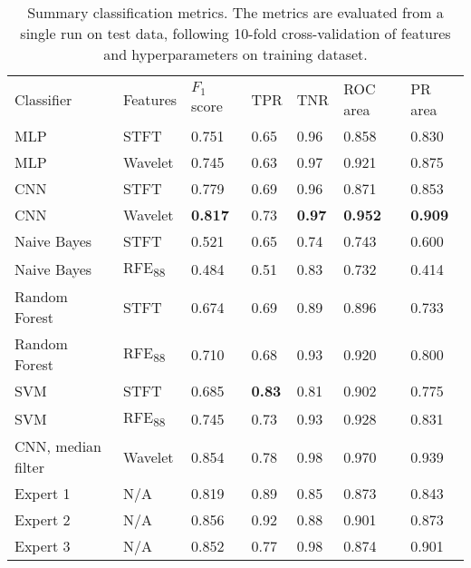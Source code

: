 \documentclass[10pt, twocolumn]{llncs}
\begin{document}
\begin{table}[t]
\centering
\caption{Summary classification metrics. The metrics are evaluated from a single run on test data, following 10-fold cross-validation of features and hyperparameters on training dataset.}
\label{tab:results}
\begin{tabular}{lllllll}
\hline\noalign{\smallskip}
Classifier & Features & $F_1$ score & TPR & TNR & ROC area & PR area \\ %
\noalign{\smallskip}
\hline\hline
\noalign{\smallskip}
MLP        & STFT     & 0.751  		& 0.65                & 0.96   	&  0.858		  & 0.830  \\
MLP        & Wavelet  &  0.745       &    0.63        &    0.97  &    0.921		  & 0.875     \\
CNN        & STFT     &   0.779   &    0.69     		    & 0.96	&  0.871	      &   0.853    \\
CNN        & Wavelet  &   \textbf{0.817}      &      0.73       & \textbf{0.97} &    \textbf{0.952}    &       \textbf{0.909}  \\
Naive Bayes      & STFT  &   0.521    &    0.65       & 0.74 &    0.743  &     0.600  \\
Naive Bayes      & RFE\textsubscript{88}  &   0.484     &     0.51        & 0.83 &   0.732  &     0.414   \\
Random Forest        & STFT &   0.674    &      0.69    & 0.89 &   0.896   &       0.733  \\
Random Forest        & RFE\textsubscript{88}  &   0.710      &    0.68      & 0.93 &    0.920   &       0.800   \\
SVM       & STFT  &   0.685      &      \textbf{0.83}     & 0.81 &   0.902   &      0.775     \\
SVM       & RFE\textsubscript{88}     &      0.745    & 0.73 & 0.93 &    0.928   &       0.831    \\
\hline\hline
CNN, median filter     & Wavelet  &   0.854      &      0.78     & 0.98 &    0.970   &       0.939    \\
\hline
Expert 1       & N/A  &   0.819      &      0.89    & 0.85 &    0.873   &       0.843    \\
Expert 2       & N/A  &   0.856      &      0.92     & 0.88 &    0.901   &       0.873    \\
Expert 3       & N/A  &   0.852      &      0.77     & 0.98 &    0.874   &       0.901    \\
\hline
\end{tabular}
\end{table}
\end{document}

